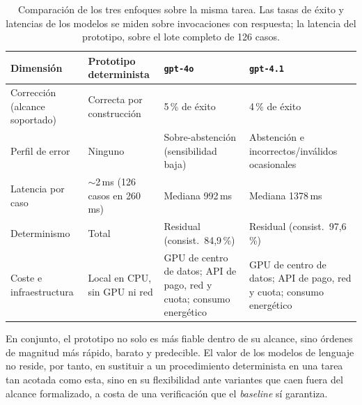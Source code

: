 \begin{table}[ht]
\centering
\caption{Comparación de los tres enfoques sobre la misma tarea. Las tasas de
éxito y latencias de los modelos se miden sobre invocaciones con respuesta; la
latencia del prototipo, sobre el lote completo de 126 casos.}
\label{tab:comparativa-coste}
\small
\begin{tabularx}{\linewidth}{@{}p{2.8cm}>{\raggedright\arraybackslash}X>{\raggedright\arraybackslash}X>{\raggedright\arraybackslash}X@{}}
\toprule
\textbf{Dimensión} & \textbf{Prototipo determinista} & \textbf{\texttt{gpt-4o}} & \textbf{\texttt{gpt-4.1}} \\
\midrule
Corrección (alcance soportado) & Correcta por construcción & 62{,}5\,\% de éxito & 77{,}4\,\% de éxito \\
Perfil de error & Ninguno & Sobre-abstención (sensibilidad baja) & Abstención e incorrectos/inválidos ocasionales \\
Latencia por caso & $\sim$2\,ms (126 casos en 260\,ms) & Mediana 992\,ms & Mediana 1378\,ms \\
Determinismo & Total & Residual (consist.\ 84{,}9\,\%) & Residual (consist.\ 97{,}6\,\%) \\
Coste e infraestructura & Local en CPU, sin GPU ni red & GPU de centro de datos; API de pago, red y cuota; consumo energético & GPU de centro de datos; API de pago, red y cuota; consumo energético \\
\bottomrule
\end{tabularx}
\end{table}

En conjunto, el prototipo no solo es más fiable dentro de su alcance, sino
órdenes de magnitud más rápido, barato y predecible. El valor de los modelos de
lenguaje no reside, por tanto, en sustituir a un procedimiento determinista en
una tarea tan acotada como esta, sino en su flexibilidad ante variantes que
caen fuera del alcance formalizado, a costa de una verificación que el
\emph{baseline} sí garantiza.

